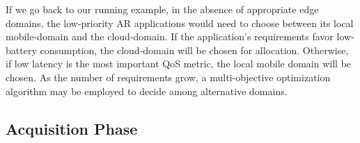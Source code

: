 


If we go back to our running example, in the absence of appropriate edge domains, the low-priority AR applications would need to choose between its local mobile-domain and the cloud-domain. If the application's requirements favor low-battery consumption, the cloud-domain will be chosen for allocation. Otherwise, if low latency is the most important QoS metric, the local mobile domain will be chosen. As the number of requirements grow, a multi-objective optimization algorithm may be employed to decide among alternative domains.







\subsection*{Acquisition Phase}\label{sec:A3-E-acquisition}


